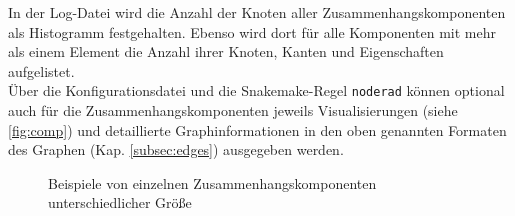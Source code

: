 In der Log-Datei wird die Anzahl der Knoten aller Zusammenhangskomponenten als Histogramm festgehalten. Ebenso wird dort für alle Komponenten mit mehr als einem Element die Anzahl ihrer Knoten, Kanten und Eigenschaften aufgelistet.\\

Über die Konfigurationsdatei und die Snakemake-Regel \lstinline|noderad| können optional auch für die Zusammenhangskomponenten jeweils Visualisierungen (siehe \autoref{fig:comp}) und detaillierte Graphinformationen in den oben genannten Formaten des Graphen (Kap. \ref{subsec:edges}) ausgegeben werden. \\
\begin{figure}[H]
	\caption{Beispiele von einzelnen Zusammenhangskomponenten unterschiedlicher Größe}
	\label{fig:comp}
\end{figure}

